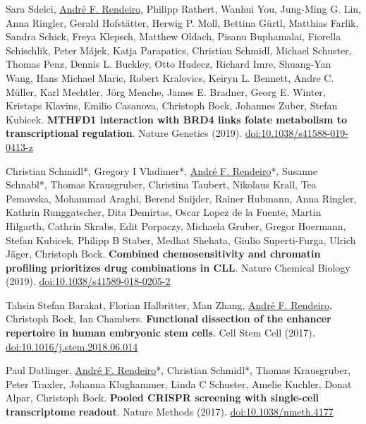 \documentclass[11pt,a4paper,roman]{moderncv} %
\begin{document}
\begin{etaremune}[leftmargin=1.0cm, itemindent=0pt, topsep=10pt, itemsep=2pt, partopsep=0pt, parsep=0pt]
        \item Sara Sdelci, \underline{André F. Rendeiro}, Philipp Rathert, Wanhui You, Jung-Ming G. Lin, Anna Ringler, Gerald Hofstätter, Herwig P. Moll, Bettina Gürtl, Matthias Farlik, Sandra Schick, Freya Klepsch, Matthew Oldach, Pisanu Buphamalai, Fiorella Schischlik, Peter Májek, Katja Parapatics, Christian Schmidl, Michael Schuster, Thomas Penz, Dennis L. Buckley, Otto Hudecz, Richard Imre, Shuang-Yan Wang, Hans Michael Maric, Robert Kralovics, Keiryn L. Bennett, Andre C. Müller, Karl Mechtler, Jörg Menche, James E. Bradner, Georg E. Winter, Kristaps Klavins, Emilio Casanova, Christoph Bock, Johannes Zuber, Stefan Kubicek. \textbf{MTHFD1 interaction with BRD4 links folate metabolism to transcriptional regulation}. Nature Genetics (2019).
        \href{https://dx.doi.org/10.1038/s41588-019-0413-z}{doi:10.1038/s41588-019-0413-z}

        \item Christian Schmidl*, Gregory I Vladimer*, \underline{André F. Rendeiro}*, Susanne Schnabl*, Thomas Krausgruber, Christina Taubert, Nikolaus Krall, Tea Pemovska, Mohammad Araghi, Berend Snijder, Rainer Hubmann, Anna Ringler, Kathrin Runggatscher, Dita Demirtas, Oscar Lopez de la Fuente, Martin Hilgarth, Cathrin Skrabs, Edit Porpaczy, Michaela Gruber, Gregor Hoermann, Stefan Kubicek, Philipp B Staber, Medhat Shehata, Giulio Superti-Furga, Ulrich Jäger, Christoph Bock. \textbf{Combined chemosensitivity and chromatin profiling prioritizes drug combinations in CLL}. Nature Chemical Biology (2019).
        \href{https://dx.doi.org/10.1038/s41589-018-0205-2}{doi:10.1038/s41589-018-0205-2}

        \item Tahsin Stefan Barakat, Florian Halbritter, Man Zhang, \underline{André F. Rendeiro}, Christoph Bock, Ian Chambers. \textbf{Functional dissection of the enhancer repertoire in human embryonic stem cells}. Cell Stem Cell (2017).
        \href{https://dx.doi.org/10.1016/j.stem.2018.06.014}{doi:10.1016/j.stem.2018.06.014}

        \item Paul Datlinger, \underline{André F. Rendeiro}*, Christian Schmidl*, Thomas Krausgruber, Peter Traxler, Johanna Klughammer, Linda C Schuster, Amelie Kuchler, Donat Alpar, Christoph Bock. \textbf{Pooled CRISPR screening with single-cell transcriptome readout}. Nature Methods (2017).
        \href{https://dx.doi.org/10.1038/nmeth.4177}{doi:10.1038/nmeth.4177}


\end{etaremune}
\end{document}
